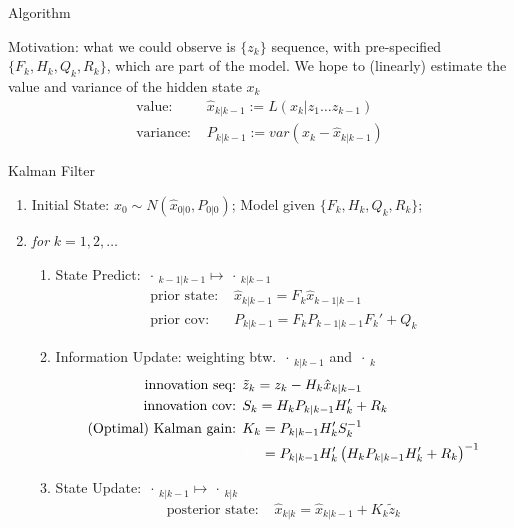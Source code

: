 \begin{point}
    Algorithm
\end{point}

Motivation: what we could observe is $ \{z_k\} $ sequence, with pre-specified $ \{F_k,H_k,Q_k,R_k\} $, which are part of the model. We hope to (linearly) estimate the value and variance of the hidden state $ x_k $
\begin{align}
    \text{value: }&\hat{x}_{k|k-1}:=L(x_k|z_1\ldots z_{k-1})\\
    \text{variance: }&P_{k|k-1}:=var\left(x_k-\hat{x}_{k|k-1}\right)
\end{align}

\begin{algorithm}{Kalman Filter}
    \begin{enumerate}[topsep=2pt,itemsep=2pt]
        \item Initial State: $ x_0\sim N(\hat{x}_{0|0}, P _{0|0})  $; Model given $ \{F_k,H_k,Q_k,R_k\} $;
        \item \textit{for} $ k=1,2,\ldots $
        \begin{enumerate}[topsep=2pt,itemsep=2pt]
            \item State Predict: $ \, \cdot \, _{k-1|k-1}\mapsto \, \cdot \, _{k|k-1} $
            \begin{align}
                \text{prior state: }&\hat{x}_{k|k-1}=F_k \hat{x}_{k-1|k-1}\\
                \text{prior cov: }&P_{k|k-1}=F_kP_{k-1|k-1}F_k'+Q_k
            \end{align}
            \item Information Update: weighting btw. $ \, \cdot \, _{k|k-1} $ and $ \, \cdot \, _{k} $
            \begin{align}
                \text{innovation seq: }&\tilde{z}_k=z_k-H_k\hat{x}_{k|k-1}\\
                \text{innovation cov: }&S_k=H_kP_{k|k-1}H_k'+R_k\\
                \text{(Optimal) Kalman gain: }&K_k=P_{k|k-1}H_k'S_k^{-1}\\
                &{\color{white}K_k}=P_{k|k-1}H_k'\left(H_kP_{k|k-1}H_k'+R_k\right)^{-1}
            \end{align}
            \item State Update: $ \, \cdot \, _{k|k-1}\mapsto \, \cdot \, _{k|k} $
            \begin{align}
                \text{posterior state: }&\hat{x}_{k|k}=\hat{x}_{k|k-1}+K_k\tilde{z}_k\\

\end{align}
\end{enumerate}
\end{enumerate}
\end{algorithm}
